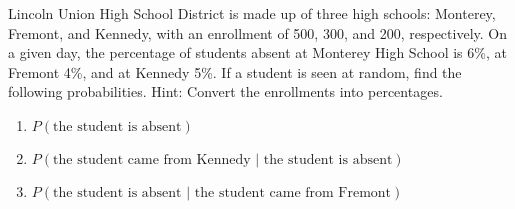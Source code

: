 \begin{puzzle}
    Lincoln Union High School District is made up of three high schools: Monterey, Fremont, and Kennedy, with an enrollment of 500, 300, and 200, respectively. On a given day, the percentage of students absent at Monterey High School is 6\%, at Fremont 4\%, and at Kennedy 5\%. If a student is seen at random, find the following probabilities. Hint: Convert the enrollments into percentages.
    \begin{enumerate}
        \item \( P(\text{the student is absent}) \)
        \item \( P(\text{the student came from Kennedy } | \text{ the student is absent}) \)
        \item \( P(\text{the student is absent } | \text{ the student came from Fremont}) \)
    \end{enumerate}
\end{puzzle}
